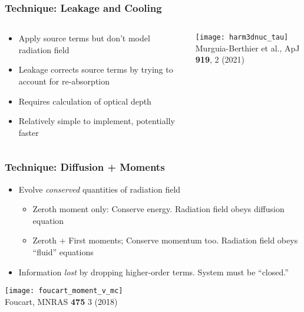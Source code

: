 \documentclass[]{beamer}
\begin{document}
\begin{frame}
  \frametitle{Technique: Leakage and Cooling}
  \begin{columns}
    \begin{column}{6cm}
      \begin{itemize}
      \item Apply source terms but don't model radiation field
      \item Leakage corrects source terms by trying to account for re-absorption
      \item Requires calculation of optical depth
      \item Relatively simple to implement, potentially faster
      \end{itemize}
    \end{column}
    \begin{column}{6cm}
      \begin{center}        
        \texttt{[image: harm3dnuc\_tau]}\\
        {\footnotesize Murguia-Berthier et al., ApJ \textbf{919}, 2 (2021)}
      \end{center}
    \end{column}
  \end{columns}
\end{frame}

\begin{frame}
  \frametitle{Technique: Diffusion + Moments}
  \begin{itemize}
  \item Evolve \textit{conserved} quantities of radiation field
    \begin{itemize}
    \item Zeroth moment only: Conserve energy. Radiation field obeys diffusion equation
    \item Zeroth + First moments; Conserve momentum too. Radiation field obeys ``fluid'' equations
    \end{itemize}
  \item Information \textit{lost} by dropping higher-order terms. System must be ``closed.''
  \end{itemize}
  \begin{center}
    \texttt{[image: foucart\_moment\_v\_mc]}\\
    {\footnotesize Foucart, MNRAS \textbf{475} 3 (2018)}
  \end{center}
\end{frame}
\end{document}
